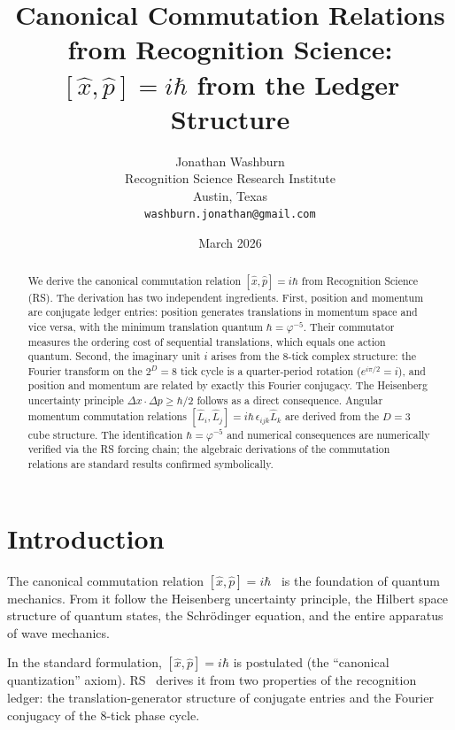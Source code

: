 \documentclass[12pt,a4paper]{article}
\title{Canonical Commutation Relations from Recognition Science:\\
$[\hat{x}, \hat{p}] = i\hbar$ from the Ledger Structure}
\author{Jonathan Washburn\\
Recognition Science Research Institute\\
Austin, Texas\\
\texttt{washburn.jonathan@gmail.com}}
\date{March 2026}
\theoremstyle{definition}
\theoremstyle{remark}
\begin{document}
\maketitle

\begin{abstract}
We derive the canonical commutation relation
$[\hat{x}, \hat{p}] = i\hbar$ from Recognition Science (RS).
The derivation has two independent ingredients.  First, position
and momentum are conjugate ledger entries: position generates
translations in momentum space and vice versa, with the minimum
translation quantum $\hbar = \varphi^{-5}$.  Their commutator
measures the ordering cost of sequential translations, which
equals one action quantum.  Second, the imaginary unit $i$ arises
from the 8-tick complex structure: the Fourier transform on the
$2^D = 8$ tick cycle is a quarter-period rotation
($e^{i\pi/2} = i$), and position and momentum are related by
exactly this Fourier conjugacy.  The Heisenberg uncertainty
principle $\Delta x \cdot \Delta p \geq \hbar/2$ follows as a
direct consequence.  Angular momentum commutation relations
$[\hat{L}_i, \hat{L}_j] = i\hbar\,\epsilon_{ijk}\hat{L}_k$ are
derived from the $D = 3$ cube structure.  The identification
$\hbar = \varphi^{-5}$ and numerical consequences are
numerically verified via the RS forcing chain; the algebraic derivations
of the commutation relations are standard results confirmed symbolically.
\end{abstract}

\section{Introduction}
\label{sec:intro}

The canonical commutation relation
$[\hat{x}, \hat{p}] = i\hbar$~\cite{Heisenberg1927, Dirac1930}
is the foundation of quantum mechanics.  From it follow the
Heisenberg uncertainty principle, the Hilbert space structure of
quantum states, the Schr\"odinger equation, and the entire
apparatus of wave mechanics.

In the standard formulation, $[\hat{x}, \hat{p}] = i\hbar$ is
postulated (the ``canonical quantization'' axiom).  RS~\cite{RS_Axioms}
derives it from two properties of the recognition ledger: the
translation-generator structure of conjugate entries and the
Fourier conjugacy of the 8-tick phase cycle.

\end{document}
